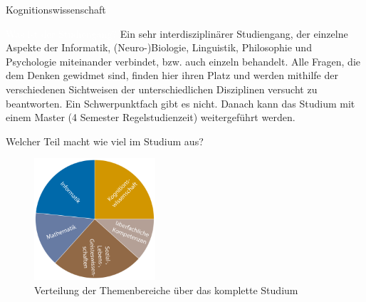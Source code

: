 	\begin{Huge}
			Kognitionswissenschaft
		\end{Huge}
		\begin{exampleblock}{\textcolor{white}{Was ist der Studiengang?}}
			Ein sehr interdisziplinärer Studiengang, der einzelne Aspekte der Informatik, (Neuro-)Biologie, Linguistik, Philosophie und Psychologie miteinander verbindet, bzw. auch einzeln behandelt. Alle Fragen, die dem Denken gewidmet sind, finden hier ihren Platz und werden mithilfe der verschiedenen Sichtweisen der unterschiedlichen Disziplinen versucht zu beantworten. Ein Schwerpunktfach gibt es nicht. Danach kann das Studium mit einem Master (4 Semester Regelstudienzeit) weitergeführt werden.
		\end{exampleblock}
	
	\begin{block}{Welcher Teil macht wie viel im Studium aus?}
		\begin{figure}[h!]
			\includegraphics[width=0.4\textwidth]{charts/kognitionswissenschaft-Piechart.pdf}
			\caption{Verteilung der Themenbereiche über das komplette Studium}
		\end{figure}
	\end{block}
	
